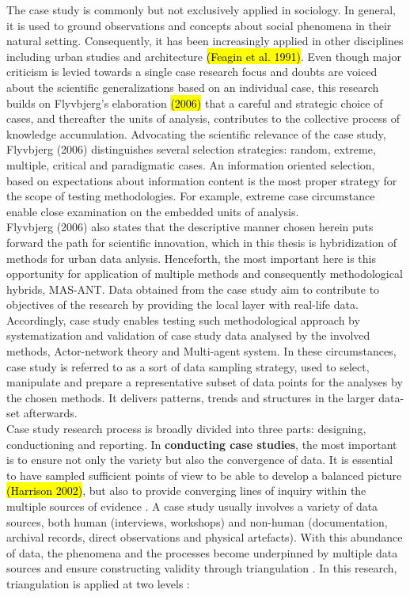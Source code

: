 \documentclass[11pt]{report}
\begin{document}
The case study is commonly but not exclusively applied in sociology. In general, it is used to ground observations and concepts about social phenomena in their natural setting. Consequently, it has been increasingly applied in other disciplines including urban studies and architecture \hl{(Feagin et al. 1991)}. Even though major criticism is levied towards a single case research focus and doubts are voiced about the scientific generalizations based on an individual case, this research builds on Flyvbjerg's elaboration \hl{(2006)} that a careful and strategic choice of cases, and thereafter the units of analysis, contributes to the collective process of knowledge accumulation. Advocating the scientific relevance of the case study, Flyvbjerg (2006) distinguishes several selection strategies: random, extreme, multiple, critical and paradigmatic cases. An information oriented selection, based on expectations about information content is the most proper strategy for the scope of testing methodologies. For example, extreme case circumstance enable close examination on the embedded units of analysis.
\\
Flyvbjerg (2006) also states that the descriptive manner chosen herein puts forward the path for scientific innovation, which in this thesis is hybridization of methods for urban data anlysis. Henceforth, the most important here is this opportunity for application of multiple methods  and consequently methodological hybrids, MAS-ANT. Data obtained from the case study aim to contribute to objectives of the research by providing the local layer with real-life data. Accordingly, case study enables testing such methodological approach by systematization and validation of case study data analysed by the involved methods, Actor-network theory and Multi-agent system. In these circumstances, case study is referred to as a sort of data sampling strategy, used to select, manipulate and prepare a representative subset of data points for the analyses by the chosen methods. It delivers patterns, trends and structures in the larger data-set afterwards.
\\
Case study research process is broadly divided into three parts: designing, conductioning and reporting. In \textbf{conducting case studies}, the most important is to ensure not only the variety but also the convergence of data. It is essential to have  sampled  sufficient  points  of  view  to be able to develop a balanced picture \hl{(Harrison 2002)}, but also to provide converging lines of inquiry within the multiple sources of evidence . A case study usually involves a variety of data sources, both human (interviews, workshops) and non-human (documentation, archival records, direct observations and physical artefacts). With this abundance of data, the phenomena and the processes become underpinned by multiple data sources and ensure constructing validity through triangulation . In this research, triangulation is applied at two levels :
\end{document}
